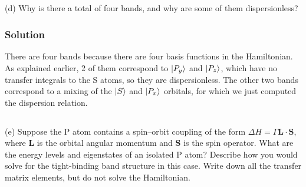 \documentclass{article}
\begin{document}
\subsection{}
(d) Why is there a total of four bands, and why are some of them dispersionless?\\
\subsubsection{Solution}
There are four bands because there are four basis functions in the Hamiltonian. As explained earlier, 2 of them correspond to $\ket{P_y}$ and $\ket{P_z}$, which have no transfer integrals to the S atoms, so they are dispersionless. The other two bands correspond to a mixing of the $\ket{S}$ and $\ket{P_x}$ orbitals, for which we just computed the dispersion relation.\\
\subsection{}
(e) Suppose the P atom contains a spin–orbit coupling of the form $\Delta H = \Gamma  \mathbf{L} \cdot \mathbf{S}$, where $\mathbf{L}$ is the orbital angular momentum and $\mathbf{S}$ is the spin operator. What are the energy levels and eigenstates of an isolated P atom? Describe how you would solve for the tight-binding band structure in this case. Write down all the transfer matrix elements, but do not solve the Hamiltonian.
\end{document}
